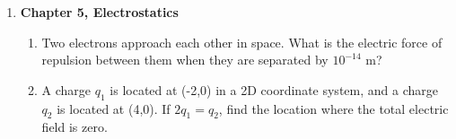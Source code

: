 \documentclass[10pt]{article}
\begin{document}
\clearpage

\begin{enumerate}
\item \textbf{Chapter 5, Electrostatics}
\begin{enumerate}
\item Two electrons approach each other in space.  What is the electric force of repulsion between them when they are separated by $10^{-14}$ m? \\ \vspace{1cm}

\item A charge $q_1$ is located at (-2,0) in a 2D coordinate system, and a charge $q_2$ is located at (4,0).  If $2 q_1 = q_2$, find the location where the total electric field is zero. \\ \vspace{2cm}


\end{enumerate}
\end{enumerate}
\end{document}
